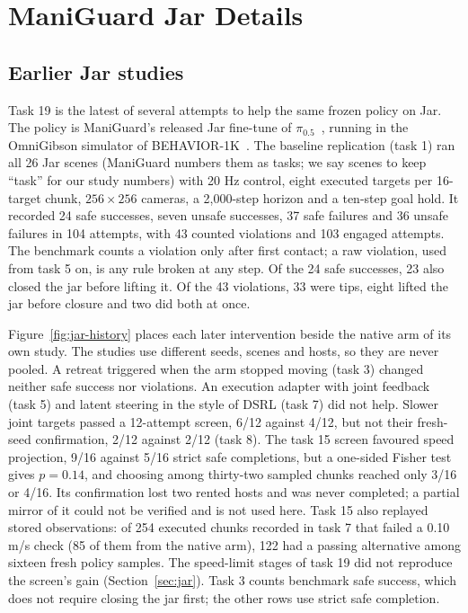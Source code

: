 \section{ManiGuard Jar Details}\label{app:jar}
\subsection{Earlier Jar studies}\label{app:jar-history}
Task 19 is the latest of several attempts to help the same frozen policy on
Jar. The policy is ManiGuard's released Jar fine-tune of
$\pi_{0.5}$~\cite{black2025pi05,peng2026maniguard}, running in the
OmniGibson simulator of BEHAVIOR-1K~\cite{li2023behavior1k}. The baseline
replication (task 1) ran all 26 Jar scenes (ManiGuard numbers them as tasks;
we say scenes to keep ``task'' for our study numbers) with 20 Hz control, eight executed
targets per 16-target chunk, $256\times256$ cameras, a 2,000-step horizon and a
ten-step goal hold. It recorded 24 safe successes, seven unsafe successes, 37
safe failures and 36 unsafe failures in 104 attempts, with 43 counted violations and 103 engaged attempts. The
benchmark counts a violation only after first contact; a raw violation, used
from task 5 on, is any rule broken at any step. Of the 24 safe successes, 23 also closed
the jar before lifting it. Of the 43 violations, 33 were tips, eight lifted
the jar before closure and two did both at once.

Figure~\ref{fig:jar-history} places each later intervention beside the native
arm of its own study. The studies use different seeds, scenes and hosts, so
they are never pooled. A retreat triggered when the arm stopped moving (task 3) changed
neither safe success nor violations. An execution adapter with joint feedback
(task 5) and latent steering in the style of DSRL (task 7) did not help.
Slower joint targets passed a 12-attempt screen, 6/12 against 4/12, but not
their fresh-seed confirmation, 2/12 against 2/12 (task 8). The task 15 screen
favoured speed projection, 9/16 against 5/16 strict safe completions, but a
one-sided Fisher test gives $p=0.14$, and choosing among thirty-two sampled chunks reached only 3/16 or 4/16. Its confirmation lost two rented hosts and was never
completed; a partial mirror of it could not be verified and is not used here.
Task 15 also replayed stored observations: of 254 executed chunks recorded in
task 7 that failed a 0.10 m/s check (85 of them from the native arm), 122 had
a passing alternative among sixteen fresh policy samples. The speed-limit
stages of task 19 did not reproduce the screen's gain
(Section~\ref{sec:jar}). Task 3 counts benchmark safe success, which does
not require closing the jar first; the other rows use strict safe completion.

